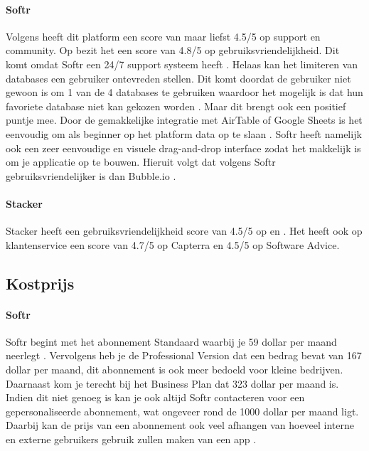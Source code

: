 \paragraph{Softr}
Volgens \textcite{Code2023} heeft dit platform een score van maar liefst 4.5/5 op support en community. 
Op \textcite{Capterra} bezit het een score van 4.8/5 op gebruiksvriendelijkheid.
Dit komt omdat Softr een 24/7 support systeem heeft \autocite{Youssef2023}. 
Helaas kan het limiteren van databases een gebruiker ontevreden stellen. Dit komt doordat de gebruiker niet gewoon is om 1 van de 4 databases te gebruiken 
waardoor het mogelijk is dat hun favoriete database niet kan gekozen worden \autocite{Frater2024}. 
Maar dit brengt ook een positief puntje mee. Door de gemakkelijke integratie met AirTable of Google Sheets is het eenvoudig om als beginner op het platform data op te slaan \autocite{Code2023}. Softr heeft namelijk ook een zeer eenvoudige en visuele drag-and-drop interface zodat het makkelijk is om je applicatie op te bouwen. Hieruit volgt dat volgens \textcite{Youssef2023} Softr gebruiksvriendelijker is dan Bubble.io .
\paragraph{Stacker}
Stacker heeft een gebruiksvriendelijkheid score van 4.5/5 op \textcite{Capterra}
en \textcite{Advice}. Het heeft ook op klantenservice een score van 4.7/5 op Capterra en 4.5/5 op Software Advice.

\subsection{Kostprijs}%
\label{subsec:kostprijs}

\paragraph{Softr}
Softr begint met het abonnement Standaard waarbij je 59 dollar per maand neerlegt \autocite{Frater2024}
\autocite{Youssef2023}. Vervolgens heb je de Professional Version dat een bedrag bevat van 167 dollar per maand, 
dit abonnement is ook meer bedoeld voor kleine bedrijven. Daarnaast kom je terecht bij het Business Plan dat 323 dollar per maand is. 
Indien dit niet genoeg is kan je ook altijd Softr contacteren voor een gepersonaliseerde abonnement, wat ongeveer rond de 1000 dollar per maand ligt. 
Daarbij kan de prijs van een abonnement ook veel afhangen van hoeveel interne en externe gebruikers gebruik zullen maken van een app \autocite{Frater2024}.

